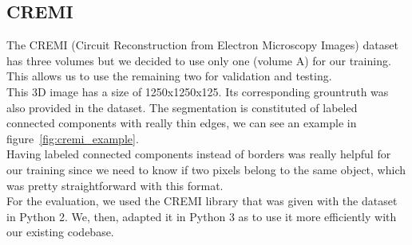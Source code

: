 \subsection{CREMI}
The CREMI (Circuit Reconstruction from Electron Microscopy Images) dataset has three volumes but we decided to use only one (volume A) for our training.
This allows us to use the remaining two for validation and testing.\\
This 3D image has a size of 1250x1250x125. Its corresponding grountruth was also provided in the dataset. 
The segmentation is constituted of labeled connected components with really thin
edges, we can see an example in figure~\ref{fig:cremi_example}.\\
Having labeled connected components instead of borders was really helpful for
our training since we need to know if two pixels belong to the same object,
which was pretty straightforward with this format.\\
For the evaluation, we used the CREMI library that was given with the dataset
in Python 2. We, then, adapted it in Python 3 as to use it more efficiently
with our existing codebase.\\

